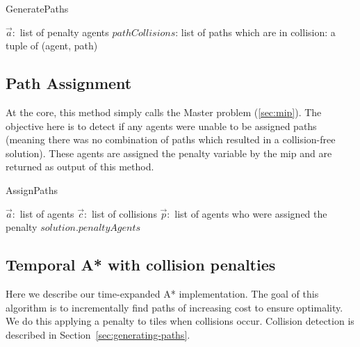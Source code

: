 \documentclass[a4paper,11pt]{article}
\let\oldReturn\Return
\renewcommand{\Return}{\State\oldReturn}
\begin{document}
\begin{algorithm}[H]
	\caption{GeneratePaths}\label{alg:generate-paths}
	\begin{algorithmic}[1]
		\Require $\vec{a}:$ list of penalty agents
		\Ensure $pathCollisions$: list of paths which are in collision: a tuple of (agent, path)
			\Else
			\EndIf
		\EndFor
	\end{algorithmic}
\end{algorithm}

\subsection{Path Assignment}
At the core, this method simply calls the Master problem (\ref{sec:mip}). The objective here is to detect if any agents were unable to be assigned paths (meaning there was no combination of paths which resulted in a collision-free solution). These agents are assigned the penalty variable by the mip and are returned as output of this method.

\begin{algorithm}
	\caption{AssignPaths}\label{alg:assignPaths}
	\begin{algorithmic}[1]
		\Require $\vec{a}:$ list of agents $\vec{c}:$ list of collisions
		\Ensure $\vec{p}:$ list of agents who were assigned the penalty
		\EndFor 
		\Return $solution.penaltyAgents$
	\end{algorithmic}
\end{algorithm}

\subsection{Temporal A* with collision penalties} \label{sec:temporalastar}
Here we describe our time-expanded A* implementation. The goal of this algorithm is to incrementally find paths of increasing cost to ensure optimality. We do this applying a penalty to tiles when collisions occur. Collision detection is described in Section~\ref{sec:generating-paths}.
\end{document}
